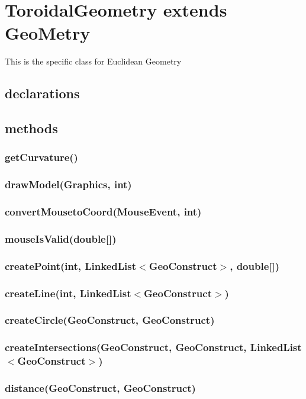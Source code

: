 \documentclass[a4paper,10pt]{report}
\begin{document}
\section{ToroidalGeometry extends GeoMetry} This is the specific class for Euclidean Geometry
\subsection{declarations}
\subsubsection{}
\subsection{methods}
\subsubsection{getCurvature()} 
\subsubsection{drawModel(Graphics, int)} 
\subsubsection{convertMousetoCoord(MouseEvent, int)} 
\subsubsection{mouseIsValid(double[])} 
\subsubsection{createPoint(int, LinkedList$<$GeoConstruct$>$, double[])} 
\subsubsection{createLine(int, LinkedList$<$GeoConstruct$>$)} 
\subsubsection{createCircle(GeoConstruct, GeoConstruct)} 
\subsubsection{createIntersections(GeoConstruct, GeoConstruct, LinkedList$<$GeoConstruct$>$)} 
\subsubsection{distance(GeoConstruct, GeoConstruct)} 
\end{document}
